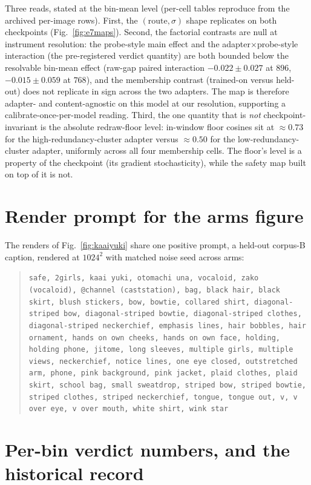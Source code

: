 Three reads, stated at the bin-mean level (per-cell tables reproduce
from the archived per-image rows). First, the $(\text{route}, \sigma)$
shape replicates on both checkpoints (Fig.~\ref{fig:e7maps}). Second,
the factorial contrasts are null at instrument resolution: the
probe-style main effect and the adapter$\times$probe-style interaction
(the pre-registered verdict quantity) are both bounded below the
resolvable bin-mean effect (raw-gap paired interaction
$-0.022 \pm 0.027$ at $896$, $-0.015 \pm 0.059$ at $768$), and the
membership contrast (trained-on versus held-out) does not replicate in
sign across the two adapters. The map is therefore adapter- and
content-agnostic on this model at our resolution, supporting a
calibrate-once-per-model reading. Third, the one quantity that is
\emph{not} checkpoint-invariant is the absolute redraw-floor level:
in-window floor cosines sit at ${\approx}0.73$ for the
high-redundancy-cluster adapter versus ${\approx}0.50$ for the
low-redundancy-cluster adapter, uniformly across all four membership
cells. The floor's level is a property of the checkpoint (its gradient
stochasticity), while the safety map built on top of it is not.

\section{Render prompt for the arms figure}
\label{app:armsprompt}

The renders of Fig.~\ref{fig:kaaiyuki} share one positive prompt, a
held-out corpus-B caption, rendered at $1024^2$ with matched noise
seed across arms:
\begin{quote}
\scriptsize\texttt{safe, 2girls, kaai yuki, otomachi una, vocaloid,
zako (vocaloid), @channel (caststation), bag, black hair, black
skirt, blush stickers, bow, bowtie, collared shirt, diagonal-striped
bow, diagonal-striped bowtie, diagonal-striped clothes,
diagonal-striped neckerchief, emphasis lines, hair bobbles, hair
ornament, hands on own cheeks, hands on own face, holding, holding
phone, jitome, long sleeves, multiple girls, multiple views,
neckerchief, notice lines, one eye closed, outstretched arm, phone,
pink background, pink jacket, plaid clothes, plaid skirt, school bag,
small sweatdrop, striped bow, striped bowtie, striped clothes,
striped neckerchief, tongue, tongue out, v, v over eye, v over mouth,
white shirt, wink star}
\end{quote}

\section{Per-bin verdict numbers, and the historical record}
\label{app:tables}

